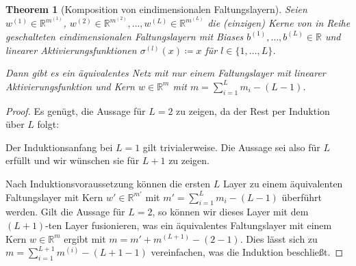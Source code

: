 \documentclass[paper=a4, 	%
		fontsize=11pt,
		abstract=true, 	%
		headsepline, 	%
		notitlepage	%
		]{scrartcl}
\newtheorem{theorem}{Theorem}[section]
\theoremstyle{definition}
\newcommand{\R}{\mathbb{R}}
\begin{document}
\begin{theorem}[Komposition von eindimensionalen Faltungslayern]\label{thm:matrix-collapse-linear-conv-layers}
    Seien $w^{(1)}\in\R^{m^{(1)}}$, $w^{(2)}\in\R^{m^{(2)}}, \dots, w^{(L)}\in\R^{m^{(L)}}$ die (einzigen) Kerne von in Reihe geschalteten eindimensionalen Faltungslayern mit Biases $b^{(1)},\dots, b^{(L)}\in\R$ und linearer Aktivierungsfunktionen $\sigma^{(l)}(x) \coloneqq x$ für $l\in\{1,\dots,L\}$.

    Dann gibt es ein äquivalentes Netz mit nur einem Faltungslayer mit linearer Aktivierungsfunktion und Kern $w\in\R^m$ mit $m=\sum_{i=1}^L m_i - (L-1)$.
\end{theorem}
\begin{proof}
    Es genügt, die Aussage für $L=2$ zu zeigen, da der Rest per Induktion über $L$ folgt:

    Der Induktionsanfang bei $L=1$ gilt trivialerweise.
    Die Aussage sei also für $L$ erfüllt und wir wünschen sie für $L+1$ zu zeigen.
        
    Nach Induktionsvoraussetzung können die ersten $L$ Layer zu einem äquivalenten Faltungslayer mit Kern $w'\in \R^{m'}$ mit $m'=\sum_{i=1}^L m_i - (L-1)$ überführt werden.
    Gilt die Aussage für $L=2$, so können wir dieses Layer mit dem $(L+1)$-ten Layer fusionieren, was ein äquivalentes Faltungslayer mit einem Kern $w\in\R^m$ ergibt mit $m = m' + m^{(L+1)} - (2-1)$.
    Dies lässt sich zu $m = \sum_{i=1}^{L+1} m^{(i)} - (L+1 - 1) $ vereinfachen, was die Induktion beschließt.
    

\end{proof}
\end{document}

